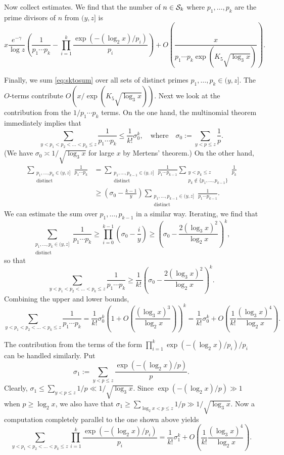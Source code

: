 \documentclass[11pt]{amsart}
\theoremstyle{remark}
\begin{document}
Now collect estimates. We find that the number of $n \in \mathcal{S}_k$ where $p_1,\dots,p_k$ are the prime divisors of $n$ from $(y,z]$ is
\begin{equation}\label{eq:sktosum} x \frac{e^{-\gamma}}{\log{z}} \left(\frac{1}{p_1\cdots p_k}-\prod_{i=1}^{k} \frac{\exp(-(\log_2 x)/p_i)}{p_i}\right) + O\left(\frac{x}{p_1\cdots p_k \exp(K_5\sqrt{\log_3 x})} \right). \end{equation}

Finally, we sum \eqref{eq:sktosum} over all sets of distinct primes $p_1,\dots,p_k \in (y,z]$. The $O$-terms contribute $O(x/\exp(K_5\sqrt{\log_3 x}))$. Next we look at the contribution from the $1/p_1\cdots p_k$ terms. On the one hand, the multinomial theorem immediately implies that
\[ \sum_{y < p_1 < p_2 < \dots < p_k \le z} \frac{1}{p_1\cdots p_k} \le \frac{1}{k!}\sigma_0^k,\quad\text{where}\quad \sigma_0 := \sum_{y < p \le z}\frac{1}{p}. \]
(We have $\sigma_0 \asymp 1/\sqrt{\log_3 x}$ for large $x$ by Mertens' theorem.) On the other hand,
\begin{align*} \sum_{\substack{p_1,\dots,p_k \in (y,z] \\ \text{distinct} }} \frac{1}{p_1\cdots p_k} &= \sum_{\substack{p_1,\dots,p_{k-1} \in (y,z]\\ \text{distinct}}} \frac{1}{p_1\cdots p_{k-1}}\sum_{\substack{y < p_k \le z \\ p_k\notin \{p_1,\dots,p_{k-1}\}}}  \frac{1}{p_k} \\ &\ge \left(\sigma_0-\frac{k-1}{y}\right) \sum_{\substack{p_1,\dots,p_{k-1} \in (y,z] \\ \text{distinct}}} \frac{1}{p_1\cdots p_{k-1}}.
 \end{align*}
We can estimate the sum over $p_1,\dots,p_{k-1}$ in a similar way. Iterating, we find that
\[ \sum_{\substack{p_1,\dots,p_{k} \in (y,z] \\ \text{distinct}}}  \frac{1}{p_1\cdots p_k} \ge \prod_{i=0}^{k-1}\left(\sigma_0-\frac{i}{y}\right)\ge \left(\sigma_0 - \frac{2(\log_3 x)^2}{\log_2 x}\right)^k, \]
so that
\[ \sum_{y < p_1 < p_2 < \dots < p_k \le z} \frac{1}{p_1\cdots p_k} \ge \frac{1}{k!}\left(\sigma_0 - \frac{2(\log_3 x)^2}{\log_2 x}\right)^k. \]
Combining the upper and lower bounds,
\[ \sum_{y < p_1 < p_2 < \dots < p_k \le z} \frac{1}{p_1\cdots p_k} = \frac{1}{k!} \sigma_0^k \left(1 + O\left(\frac{(\log_3 x)^3}{\log_2 x}\right)\right)^k = \frac{1}{k!} \sigma_0^k + O\left(\frac{1}{k!}\frac{(\log_3 x)^4}{\log_2 x}\right).\]

The contribution from the terms of the form $\prod_{i=1}^{k} \exp(-(\log_2 x)/p_i)/p_i$ can be handled similarly. Put
\[ \sigma_1 := \sum_{y < p \le z} \frac{\exp(-(\log_2 x)/p)}{p}.  \]
Clearly, $\sigma_1 \le \sum_{y < p \le z} 1/p \ll 1/\sqrt{\log_3 x}$. Since $\exp(-(\log_2 x)/p) \gg 1$ when $p \ge \log_2 x$, we also have that $\sigma_1 \ge \sum_{\log_2 x < p \le z} 1/p \gg 1/\sqrt{\log_3 x}$. Now a computation completely parallel to the one shown above yields
\[ \sum_{y < p_1 < p_2 < \dots < p_k \le z} \prod_{i=1}^{k} \frac{\exp(-(\log_2 x)/p_i)}{p_i} = \frac{1}{k!} \sigma_1^k + O\left(\frac{1}{k!}\frac{(\log_3 x)^4}{\log_2 x}\right). \]
\end{document}
